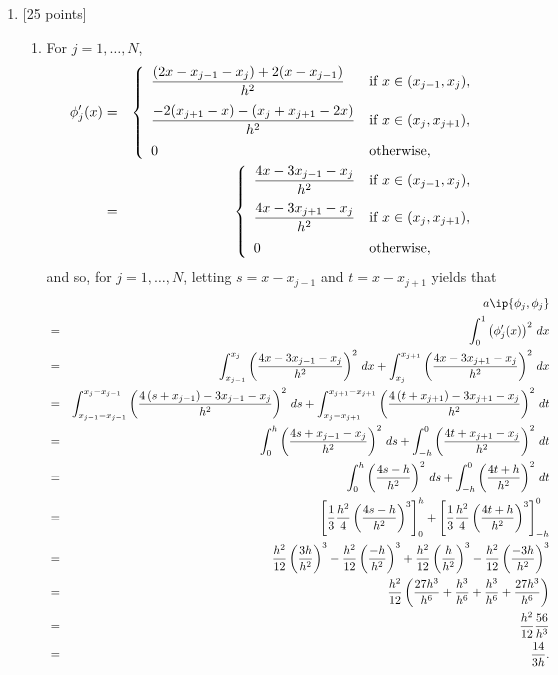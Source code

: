\begin{solution}
\begin{enumerate}
\item {[25 points]}
\begin{enumerate}
\item For $j=1,\ldots,N$,
\begin{eqnarray*}
\phi_j'(x)&=&\left\{\begin{array}{ll}
\displaystyle{{(2x-x_{j-1}-x_j)+2(x-x_{j-1}) \over h^2}} & \displaystyle{\mbox{if }x\in(x_{j-1},x_j)},
\\[10pt]
\displaystyle{{-2(x_{j+1}-x)-(x_j+x_{j+1}-2x) \over h^2}} & \displaystyle{\mbox{if }x\in(x_j,x_{j+1})},
\\[10pt]
0 & \mbox{otherwise},
\end{array}\right.
\\
&=&\left\{\begin{array}{ll}
\displaystyle{{4x-3x_{j-1}-x_j \over h^2}} & \displaystyle{\mbox{if }x\in(x_{j-1},x_j)},
\\[10pt]
\displaystyle{{4x-3x_{j+1}-x_j \over h^2}} & \displaystyle{\mbox{if }x\in(x_j,x_{j+1})},
\\[10pt]
0 & \mbox{otherwise},
\end{array}\right.
\end{eqnarray*}
and so, for $j=1,\ldots,N$, letting $s=x-x_{j-1}$ and $t=x-x_{j+1}$ yields that
\begin{eqnarray*}
&&a\ip{\phi_j,\phi_j}
\\
&=&\int_0^1\left(\phi_j'(x)\right)^2\,dx
\\
&=&\int_{x_{j-1}}^{x_j}\left({4x-3x_{j-1}-x_j \over h^2}\right)^2\,dx+\int_{x_j}^{x_{j+1}}\left({4x-3x_{j+1}-x_j \over h^2}\right)^2\,dx
\\
&=&\int_{x_{j-1}-x_{j-1}}^{x_j-x_{j-1}}\left({4\left(s+x_{j-1}\right)-3x_{j-1}-x_j \over h^2}\right)^2\,ds+\int_{x_j-x_{j+1}}^{x_{j+1}-x_{j+1}}\left({4\left(t+x_{j+1}\right)-3x_{j+1}-x_j \over h^2}\right)^2\,dt
\\
&=&\int_0^h\left({4s+x_{j-1}-x_j \over h^2}\right)^2\,ds+\int_{-h}^0\left({4t+x_{j+1}-x_j \over h^2}\right)^2\,dt
\\
&=&\int_0^h\left({4s-h \over h^2}\right)^2\,ds+\int_{-h}^0\left({4t+h \over h^2}\right)^2\,dt
\\
&=&\left[{1 \over 3}{h^2 \over 4}\left({4s-h \over h^2}\right)^3\right]_0^h+\left[{1 \over 3}{h^2 \over 4}\left({4t+h \over h^2}\right)^3\right]_{-h}^0
\\
&=&{h^2 \over 12}\left({3h \over h^2}\right)^3-{h^2 \over 12}\left({-h \over h^2}\right)^3+{h^2 \over 12}\left({h \over h^2}\right)^3-{h^2 \over 12}\left({-3h \over h^2}\right)^3
\\
&=&{h^2 \over 12}\left({27h^3 \over h^6}+{h^3 \over h^6}+{h^3 \over h^6}+{27h^3 \over h^6}\right)
\\
&=&{h^2 \over 12}{56 \over h^3}
\\
&=&{14 \over 3h}.
\end{eqnarray*}


\end{enumerate}
\end{enumerate}
\end{solution}
